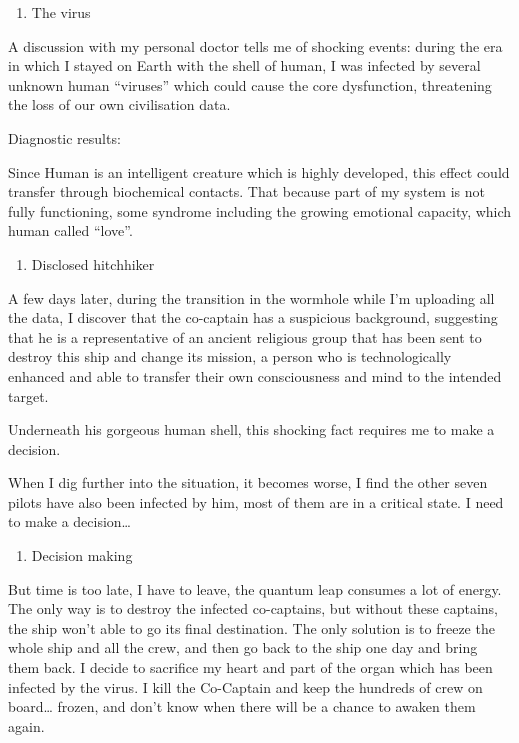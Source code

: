 \begin{enumerate}
\def\labelenumi{\arabic{enumi}.}
\setcounter{enumi}{7}
\tightlist
\item
  The virus
\end{enumerate}

A discussion with my personal doctor tells me of shocking events: during
the era in which I stayed on Earth with the shell of human, I was
infected by several unknown human ``viruses'' which could cause the core
dysfunction, threatening the loss of our own civilisation data.

Diagnostic results:

Since Human is an intelligent creature which is highly developed, this
effect could transfer through biochemical contacts. That because part of
my system is not fully functioning, some syndrome including the growing
emotional capacity, which human called ``love''.

\begin{enumerate}
\def\labelenumi{\arabic{enumi}.}
\setcounter{enumi}{8}
\tightlist
\item
  Disclosed hitchhiker
\end{enumerate}

A few days later, during the transition in the wormhole while I'm
uploading all the data, I discover that the co-captain has a suspicious
background, suggesting that he is a representative of an ancient
religious group that has been sent to destroy this ship and change its
mission, a person who is technologically enhanced and able to transfer
their own consciousness and mind to the intended target.

Underneath his gorgeous human shell, this shocking fact requires me to
make a decision.

When I dig further into the situation, it becomes worse, I find the
other seven pilots have also been infected by him, most of them are in a
critical state. I need to make a decision\ldots{}

\begin{enumerate}
\def\labelenumi{\arabic{enumi}.}
\setcounter{enumi}{9}
\tightlist
\item
  Decision making
\end{enumerate}

But time is too late, I have to leave, the quantum leap consumes a lot
of energy. The only way is to destroy the infected co-captains, but
without these captains, the ship won't able to go its final destination.
The only solution is to freeze the whole ship and all the crew, and then
go back to the ship one day and bring them back. I decide to sacrifice
my heart and part of the organ which has been infected by the virus. I
kill the Co-Captain and keep the hundreds of crew on board\ldots{}
frozen, and don't know when there will be a chance to awaken them again.

